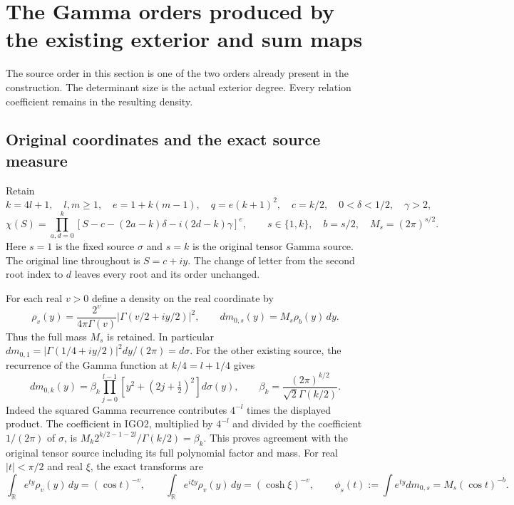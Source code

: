 \documentclass[11pt,a4paper]{article}
\begin{document}


\section{The Gamma orders produced by the existing exterior and sum maps}
\label{sec:IGO}

The source order in this section is one of the two orders already present
in the construction. The determinant size is the actual exterior degree.
Every relation coefficient remains in the resulting density.

\subsection{Original coordinates and the exact source measure}
Retain
\[
 k=4l+1,\quad l,m\geq1,\quad e=1+k(m-1),\quad
 q=e(k+1)^2,\quad c=k/2,\quad
 0<\delta<1/2,\quad\gamma>2,
\]
\[
 \chi(S)=\prod_{a,d=0}^{k}
 [S-c-(2a-k)\delta-i(2d-k)\gamma]^e,
 \qquad s\in\{1,k\},\quad b=s/2,\quad M_s=(2\pi)^{s/2}.
 \tag{IGO1}
\]
Here $s=1$ is the fixed source $\sigma$ and $s=k$ is the original
tensor Gamma source. The original line throughout is $S=c+iy$.
The change of letter from the second root index to $d$ leaves every
root and its order unchanged.

For each real $v>0$ define a density on the real coordinate by
\[
 \rho_v(y)=\frac{2^v}{4\pi\Gamma(v)}
       \left|\Gamma(v/2+iy/2)\right|^2,
 \qquad dm_{0,s}(y)=M_s\rho_b(y)\,dy.
 \tag{IGO2}
\]
Thus the full mass $M_s$ is retained. In particular
$dm_{0,1}=|\Gamma(1/4+iy/2)|^2dy/(2\pi)=d\sigma$.
For the other existing source, the recurrence of the Gamma function
at $k/4=l+1/4$ gives
\[
 dm_{0,k}(y)=\beta_k\prod_{j=0}^{l-1}
           [y^2+(2j+\tfrac12)^2]d\sigma(y),\qquad
 \beta_k=\frac{(2\pi)^{k/2}}{\sqrt2\Gamma(k/2)}.
\]
Indeed the squared Gamma recurrence contributes $4^{-l}$ times
the displayed product. The coefficient in IGO2, multiplied by
$4^{-l}$ and divided by the coefficient $1/(2\pi)$ of $\sigma$,
is $M_k2^{k/2-1-2l}/\Gamma(k/2)=\beta_k$.
This proves agreement with the original tensor source including
its full polynomial factor and mass.
For real $|t|<\pi/2$ and real $\xi$, the exact transforms are
\[
 \int_{\mathbb R}e^{ty}\rho_v(y)\,dy=(\cos t)^{-v},\qquad
 \int_{\mathbb R}e^{i\xi y}\rho_v(y)\,dy=(\cosh\xi)^{-v},
 \qquad \phi_s(t):=\int e^{ty}dm_{0,s}=M_s(\cos t)^{-b}.
 \tag{IGO3}
\]
\end{document}
